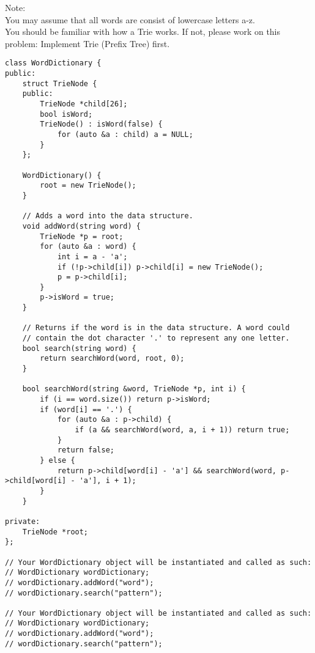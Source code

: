 Note:\\
You may assume that all words are consist of lowercase letters a-z.\\
You should be familiar with how a Trie works. If not, please work on this problem: Implement Trie (Prefix Tree) first. \\

\begin{lstlisting}
class WordDictionary {
public:
    struct TrieNode {
    public:
        TrieNode *child[26];
        bool isWord;
        TrieNode() : isWord(false) {
            for (auto &a : child) a = NULL;
        }
    };
    
    WordDictionary() {
        root = new TrieNode();
    }
    
    // Adds a word into the data structure.
    void addWord(string word) {
        TrieNode *p = root;
        for (auto &a : word) {
            int i = a - 'a';
            if (!p->child[i]) p->child[i] = new TrieNode();
            p = p->child[i];
        }
        p->isWord = true;
    }

    // Returns if the word is in the data structure. A word could
    // contain the dot character '.' to represent any one letter.
    bool search(string word) {
        return searchWord(word, root, 0);
    }
    
    bool searchWord(string &word, TrieNode *p, int i) {
        if (i == word.size()) return p->isWord;
        if (word[i] == '.') {
            for (auto &a : p->child) {
                if (a && searchWord(word, a, i + 1)) return true;
            }
            return false;
        } else {
            return p->child[word[i] - 'a'] && searchWord(word, p->child[word[i] - 'a'], i + 1);
        }
    }
    
private:
    TrieNode *root;
};

// Your WordDictionary object will be instantiated and called as such:
// WordDictionary wordDictionary;
// wordDictionary.addWord("word");
// wordDictionary.search("pattern");

// Your WordDictionary object will be instantiated and called as such:
// WordDictionary wordDictionary;
// wordDictionary.addWord("word");
// wordDictionary.search("pattern");
\end{lstlisting}


